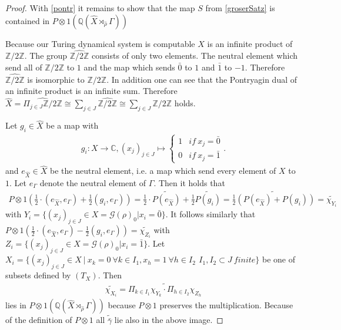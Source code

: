 \documentclass[12pt,a4paper]{scrartcl}
\numberwithin{equation}{section}
\newcommand{\C}{\mathbb{C}} %
\newcommand{\Q}{\mathbb{Q}} %
\newcommand{\2}{\mathbb{Z} / 2 \mathbb{Z}}
\newcommand{\G}{\mathcal{G}}
\newcommand{\1}{\bar{1}}
\newcommand{\0}{\bar{0}}
\begin{document}
\begin{proof}
	With \ref{pontr} it remains to show that the map $S$ from \ref{groserSatz} is contained in $P \otimes 1(\Q (\hat{X} \rtimes_{\hat{\rho}} \Gamma))$
	
	Because our Turing dynamical system is computable $X$ is an infinite product of $\2$. The group $\hat{\2}$ consists of only two elements. The neutral element which send all of $\2$ to $1$ and the map which sends $\0$ to $1$ and $\1$ to $-1$. Therefore $\hat{\2}$ is isomorphic to $\2$. In addition one can see  that the Pontryagin dual of an infinite product is an infinite sum. Therefore $\hat{X} = \hat{\Pi_{j \in J} \2} \cong \sum_{j \in J} \hat{\2} \cong \sum_{j \in J} \2$ holds.
		
	Let $g_i \in \hat{X}$ be a map with
	\begin{align*}
		g_i: X \to \C, (x_j)_{j \in J} \mapsto \begin{cases}
			1 & if \ x_j = \0 \\
			0 & if \ x_j = \1
		\end{cases}.
	\end{align*} 
	and $e_{\hat{X}} \in \hat{X}$ be the neutral element, i.e. a map which send every element of $X$ to $1$. Let $e_{\Gamma}$ denote the neutral element of $\Gamma$. Then it holds that
	\begin{align*}
		P \otimes 1(\frac{1}{2} \cdot (e_{\hat{X}}, e_{\Gamma}) + \frac{1}{2}(g_i, e_{\Gamma})) = \frac{1}{2} \cdot \widetilde{P(e_{\hat{X}})} + \frac{1}{2} \widetilde{P(g_i)} = \widetilde{\frac{1}{2}(P(e_{\hat{X}}) + P(g_i))} = \tilde{\chi_{Y_i}}
	\end{align*}
	with $Y_i = \{(x_j)_{j \in J} \in X = \G (\rho)_0| x_i = \0\}$. It follows similarly that $P \otimes 1(\frac{1}{2} \cdot (e_{\hat{X}}, e_{\Gamma}) - \frac{1}{2}(g_i, e_{\Gamma})) = \tilde{\chi_{Z_i}}$ with $Z_i = \{(x_j)_{j \in J} \in X = \G (\rho)_0| x_i = \1\}$. 
	Let $X_i = \{(x_j)_{j \in J} \in X \ | \ x_k = 0 \ \forall k \in I_1, x_h = 1 \ \forall h \in I_2\, \ I_1, I_2 \subset J \ finite\}$ be one of subsets defined by $(T_X)$. Then 
	\begin{align*}
		\widetilde{\chi_{X_i}} = \widetilde{\Pi_{k \in I_1} \chi_{Y_k} \cdot \Pi_{h \in I_2} \chi_{Z_h}}
	\end{align*}
	lies in $P \otimes 1(\Q (\hat{X} \rtimes_{\hat{\rho}} \Gamma))$ because $P \otimes 1$ preserves the multiplication. Because of the definition of $P \otimes 1$ all $\tilde{\bar{\gamma}}$ lie also in the above image.
\end{proof}
\end{document}
